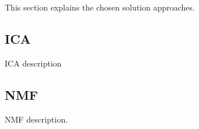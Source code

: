 \documentclass[../main.tex]{subfiles} %
\begin{document}
This section explains the chosen solution approaches.

\subsection{ICA}

ICA description

\subsection{NMF}

NMF description.
\end{document}
